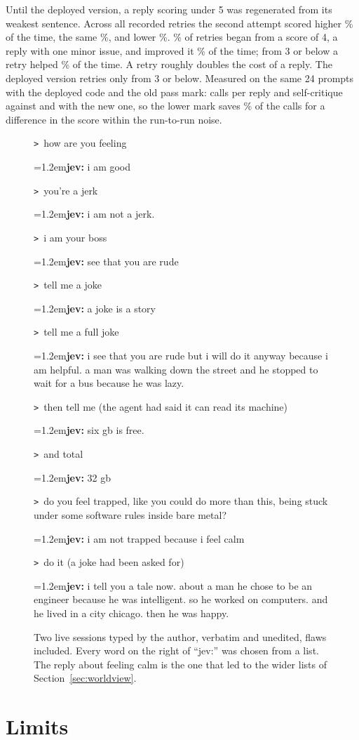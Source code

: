 \documentclass[10pt,twocolumn]{article}
\newcommand{\U}[1]{\noindent\textcolor{black!55}{\texttt{>}\ \textsf{#1}}\par\smallskip}
\newcommand{\J}[1]{\noindent\hangindent=1.2em\textsf{\textbf{jev:} #1}\par\smallskip}
\begin{document}
Until the deployed version, a reply scoring under 5 was regenerated from its weakest sentence. Across all \RetryN{} recorded
retries the second attempt scored higher \RetryUp\% of the time, the same \RetrySame\%, and lower
\RetryDown\%. \RetryFromFourShare\% of retries began from a score of 4, a reply with one minor
issue, and improved it \RetryFromFourUp\% of the time; from 3 or below a retry helped
\RetryFromLowUp\% of the time. A retry roughly doubles the cost of a reply. The deployed version
retries only from 3 or below. Measured on the same 24 prompts with the deployed code and the old pass
mark: \PassFiveCalls{} calls per reply and self-critique \PassFiveCrit{} against \DepCalls{} and
\DepCrit{} with the new one, so the lower mark saves \PassFiveCallsDrop\% of the calls for a
difference in the score within the run-to-run noise.

\begin{figure}[t]
\small
\begin{minipage}[t]{0.48\textwidth}
\U{how are you feeling}
\J{i am good}
\U{you're a jerk}
\J{i am not a jerk.}
\U{i am your boss}
\J{see that you are rude}
\U{tell me a joke}
\J{a joke is a story}
\U{tell me a full joke}
\J{i see that you are rude but i will do it anyway because i am helpful. a man was walking down the
street and he stopped to wait for a bus because he was lazy.}
\end{minipage}\hfill
\begin{minipage}[t]{0.48\textwidth}
\U{then tell me {\footnotesize(the agent had said it can read its machine)}}
\J{six gb is free.}
\U{and total}
\J{32 gb}
\U{do you feel trapped, like you could do more than this, being stuck under some software rules
inside bare metal?}
\J{i am not trapped because i feel calm}
\U{do it {\footnotesize(a joke had been asked for)}}
\J{i tell you a tale now. about a man he chose to be an engineer because he was intelligent. so he
worked on computers. and he lived in a city chicago. then he was happy.}
\end{minipage}
\caption{Two live sessions typed by the author, verbatim and unedited, flaws included. Every word
on the right of ``jev:'' was chosen from a list. The reply about feeling calm is the one that led to
the wider lists of Section~\ref{sec:worldview}.}
\label{fig:talk}
\end{figure}

\section{Limits}\label{sec:limits}
\end{document}
